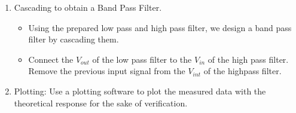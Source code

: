 \documentclass[a4paper,12pt]{article}
\begin{document}
\begin{enumerate}
\begin{itemize}
		\end{itemize}
	\item Cascading to obtain a Band Pass Filter.
		\begin{itemize}
			\item Using the prepared low pass and high pass filter, we design a band pass filter by cascading them.
			\item Connect the $V_{out}$ of the low pass filter to the $V_{in}$ of the high pass filter. Remove the previous input signal from the $V_{int}$ of the highpass filter. 
		\end{itemize}
	\item Plotting: Use a plotting software to plot the measured data with the theoretical response for the sake of verification.
\end{enumerate}
\end{document}
